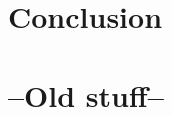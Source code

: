 \documentclass[runningheads]{llncs}
\begin{document}
\section{Conclusion}


\section{--Old stuff--}

\newpage





\end{document}
